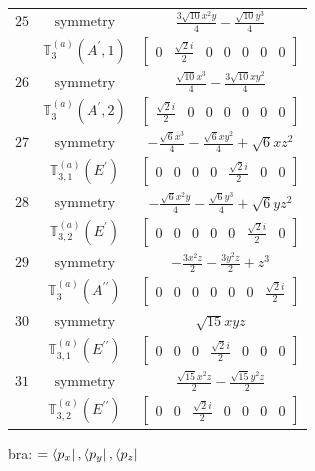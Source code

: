 \documentclass[fleqn,8pt,landscape]{jsarticle}
\begin{document}
\begin{longtable}{ccc}
$ 25 $ & $ \text{symmetry} $ & $ \frac{3 \sqrt{10} x^{2} y}{4} - \frac{\sqrt{10} y^{3}}{4} $ \\
$  $ & $ \mathbb{T}_{3}^{(a)}(A^{\prime},1) $ & $ \begin{bmatrix} 0 & \frac{\sqrt{2} i}{2} & 0 & 0 & 0 & 0 & 0 \end{bmatrix} $ \\ \hline
$ 26 $ & $ \text{symmetry} $ & $ \frac{\sqrt{10} x^{3}}{4} - \frac{3 \sqrt{10} x y^{2}}{4} $ \\
$  $ & $ \mathbb{T}_{3}^{(a)}(A^{\prime},2) $ & $ \begin{bmatrix} \frac{\sqrt{2} i}{2} & 0 & 0 & 0 & 0 & 0 & 0 \end{bmatrix} $ \\ \hline
$ 27 $ & $ \text{symmetry} $ & $ - \frac{\sqrt{6} x^{3}}{4} - \frac{\sqrt{6} x y^{2}}{4} + \sqrt{6} x z^{2} $ \\
$  $ & $ \mathbb{T}_{3,1}^{(a)}(E^{\prime}) $ & $ \begin{bmatrix} 0 & 0 & 0 & 0 & \frac{\sqrt{2} i}{2} & 0 & 0 \end{bmatrix} $ \\ \hline
$ 28 $ & $ \text{symmetry} $ & $ - \frac{\sqrt{6} x^{2} y}{4} - \frac{\sqrt{6} y^{3}}{4} + \sqrt{6} y z^{2} $ \\
$  $ & $ \mathbb{T}_{3,2}^{(a)}(E^{\prime}) $ & $ \begin{bmatrix} 0 & 0 & 0 & 0 & 0 & \frac{\sqrt{2} i}{2} & 0 \end{bmatrix} $ \\ \hline
$ 29 $ & $ \text{symmetry} $ & $ - \frac{3 x^{2} z}{2} - \frac{3 y^{2} z}{2} + z^{3} $ \\
$  $ & $ \mathbb{T}_{3}^{(a)}(A^{\prime\prime}) $ & $ \begin{bmatrix} 0 & 0 & 0 & 0 & 0 & 0 & \frac{\sqrt{2} i}{2} \end{bmatrix} $ \\ \hline
$ 30 $ & $ \text{symmetry} $ & $ \sqrt{15} x y z $ \\
$  $ & $ \mathbb{T}_{3,1}^{(a)}(E^{\prime\prime}) $ & $ \begin{bmatrix} 0 & 0 & 0 & \frac{\sqrt{2} i}{2} & 0 & 0 & 0 \end{bmatrix} $ \\ \hline
$ 31 $ & $ \text{symmetry} $ & $ \frac{\sqrt{15} x^{2} z}{2} - \frac{\sqrt{15} y^{2} z}{2} $ \\
$  $ & $ \mathbb{T}_{3,2}^{(a)}(E^{\prime\prime}) $ & $ \begin{bmatrix} 0 & 0 & \frac{\sqrt{2} i}{2} & 0 & 0 & 0 & 0 \end{bmatrix} $ \\ \hline
\end{longtable}
bra: $=\bra{p_{x}}, \bra{p_{y}}, \bra{p_{z}}$
\end{document}
